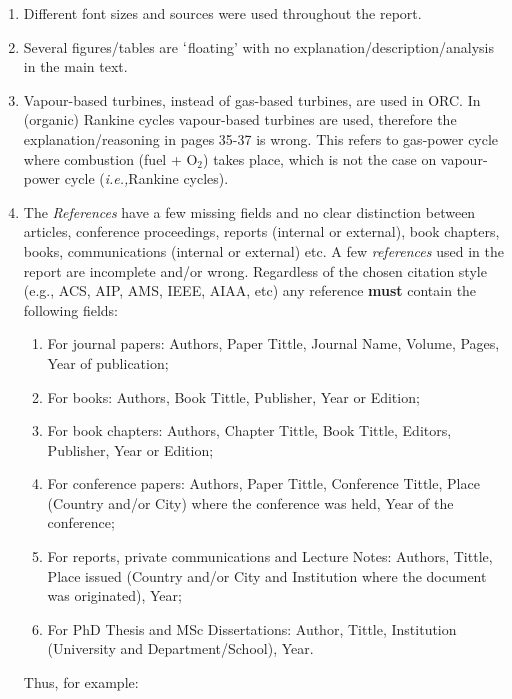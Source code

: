 \documentclass[14pt,twoside]{report}
\newcommand{\ie}{{\it i.e.,}}
\begin{document}
\begin{description}
\begin{enumerate}
%
\item Different font sizes and sources were used throughout the report.
%
\item Several figures/tables are $\lq$floating' with no explanation/description/analysis in the main text.
%
\item Vapour-based turbines, instead of gas-based turbines, are used in ORC. In (organic) Rankine cycles vapour-based turbines are used, therefore the explanation/reasoning in pages 35-37 is wrong. This refers to gas-power cycle where combustion (fuel + O$_{2}$) takes place, which is not the case on vapour-power cycle (\ie Rankine cycles).  
%
\item The {\it References} have a few missing fields and no clear distinction between articles, conference proceedings, reports (internal or external), book chapters, books, communications (internal or external) etc.  A few {\it references} used in the report are incomplete and/or wrong. Regardless of the chosen citation style (e.g., ACS, AIP, AMS, IEEE, AIAA, etc) any reference {\bf must} contain the following fields: 
\begin{enumerate}
\item For journal papers: Authors, Paper Tittle, Journal Name, Volume, Pages, Year of publication;
\item For books: Authors, Book Tittle, Publisher, Year or Edition;
\item For book chapters: Authors, Chapter Tittle, Book Tittle, Editors, Publisher, Year or Edition;
\item For conference papers: Authors, Paper Tittle, Conference Tittle, Place (Country and/or City) where the conference was held, Year of the conference;
\item For reports, private communications and Lecture Notes: Authors, Tittle, Place issued (Country and/or City and Institution where the document was originated), Year;
\item For PhD Thesis and MSc Dissertations: Author, Tittle, Institution (University and Department/School), Year.
\end{enumerate}  
Thus, for example:
\end{enumerate}
\end{description}
\end{document}
